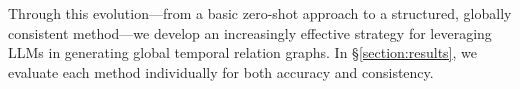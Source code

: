Through this evolution—from a basic zero-shot approach to a structured, globally consistent method—we develop an increasingly effective strategy for leveraging LLMs in generating global temporal relation graphs. In §\ref{section:results}, we evaluate each method individually for both accuracy and consistency.  
